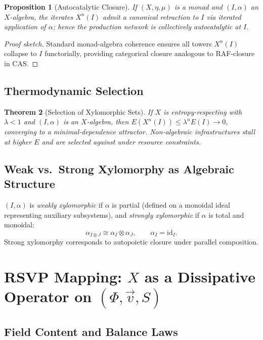 \documentclass[11pt,a4paper]{article}
\theoremstyle{plain}
\newtheorem{theorem}{Theorem}
\newtheorem{proposition}[theorem]{Proposition}
\theoremstyle{definition}
\theoremstyle{remark}
\begin{document}
\begin{proposition}[Autocatalytic Closure]
If $(X,\eta,\mu)$ is a monad and $(I,\alpha)$ an $X$-algebra, the iterates
$X^n(I)$ admit a canonical retraction to $I$ via iterated application of
$\alpha$; hence the production network is collectively autocatalytic at $I$.
\end{proposition}

\begin{proof}[Proof sketch]
Standard monad-algebra coherence ensures all towers $X^n(I)$ collapse to $I$
functorially, providing categorical closure analogous to RAF-closure in CAS.
\end{proof}

\subsection{Thermodynamic Selection}

\begin{theorem}[Selection of Xylomorphic Sets]
\label{thm:selection}
If $X$ is entropy-respecting with $\lambda < 1$ and $(I,\alpha)$ is an
$X$-algebra, then $E(X^n(I)) \leq \lambda^n E(I) \to 0$, converging to a
minimal-dependence attractor. Non-algebraic infrastructures stall at higher
$E$ and are selected against under resource constraints.
\end{theorem}

\subsection{Weak vs.\ Strong Xylomorphy as Algebraic Structure}

$(I,\alpha)$ is \emph{weakly xylomorphic} if $\alpha$ is partial (defined on a
monoidal ideal representing auxiliary subsystems), and \emph{strongly
xylomorphic} if $\alpha$ is total and monoidal:
\[
  \alpha_{I \otimes J} \cong \alpha_I \otimes \alpha_J, \qquad
  \alpha_I = \mathrm{id}_I.
\]
Strong xylomorphy corresponds to autopoietic closure under parallel
composition.

\section{RSVP Mapping: $X$ as a Dissipative Operator on $(\Phi, \vec{v}, S)$}
\label{app:rsvp}

\subsection{Field Content and Balance Laws}
\end{document}
